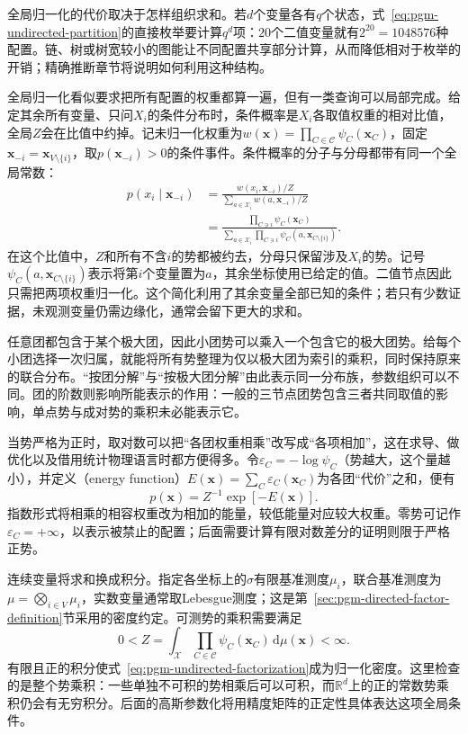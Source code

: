 全局归一化的代价取决于怎样组织求和。若$d$个变量各有$q$个状态，式~\eqref{eq:pgm-undirected-partition}的直接枚举要计算$q^d$项：$20$个二值变量就有$2^{20}=1048576$种配置。链、树或树宽较小的图能让不同配置共享部分计算，从而降低相对于枚举的开销；精确推断章节将说明如何利用这种结构。

全局归一化看似要求把所有配置的权重都算一遍，但有一类查询可以局部完成。给定其余所有变量、只问$X_i$的条件分布时，条件概率是$X_i$各取值权重的相对比值，全局$Z$会在比值中约掉。记未归一化权重为$w(\bm{x})=\prod_{C\in\mathcal C}\psi_C(\bm{x}_C)$，固定$\bm{x}_{-i}=\bm{x}_{V\setminus\{i\}}$，取$p(\bm{x}_{-i})>0$的条件事件。条件概率的分子与分母都带有同一个全局常数：
\begin{equation}
  \begin{aligned}
    p(x_i\mid\bm{x}_{-i})
      &=\frac{w(x_i,\bm{x}_{-i})/Z}
        {\sum_{a\in\mathcal X_i}w(a,\bm{x}_{-i})/Z}\\
      &=\frac{\prod_{C\ni i}\psi_C(\bm{x}_C)}
        {\sum_{a\in\mathcal X_i}
          \prod_{C\ni i}\psi_C(a,\bm{x}_{C\setminus\{i\}})}.
  \end{aligned}
  \label{eq:pgm-undirected-local-conditional}
\end{equation}
在这个比值中，$Z$和所有不含$i$的势都被约去，分母只保留涉及$X_i$的势。记号$\psi_C(a,\bm{x}_{C\setminus\{i\}})$表示将第$i$个变量置为$a$，其余坐标使用已给定的值。二值节点因此只需把两项权重归一化。这个简化利用了其余变量全部已知的条件；若只有少数证据，未观测变量仍需边缘化，通常会留下更大的求和。

任意团都包含于某个极大团，因此小团势可以乘入一个包含它的极大团势。给每个小团选择一次归属，就能将所有势整理为仅以极大团为索引的乘积，同时保持原来的联合分布。“按团分解”与“按极大团分解”由此表示同一分布族，参数组织可以不同。团的阶数则影响所能表示的作用：一般的三节点团势包含三者共同取值的影响，单点势与成对势的乘积未必能表示它。

当势严格为正时，取对数可以把“各团权重相乘”改写成“各项相加”，这在求导、做优化以及借用统计物理语言时都方便得多。令$\varepsilon_C=-\log\psi_C$（势越大，这个量越小），并定义（energy function）$E(\bm{x})=\sum_C\varepsilon_C(\bm{x}_C)$为各团“代价”之和，便有
\[
  p(\bm{x})=Z^{-1}\exp[-E(\bm{x})].
\]
指数形式将相乘的相容权重改为相加的能量，较低能量对应较大权重。零势可记作$\varepsilon_C=+\infty$，以表示被禁止的配置；后面需要计算有限对数差分的证明则限于严格正势。

连续变量将求和换成积分。指定各坐标上的$\sigma$有限基准测度$\mu_i$，联合基准测度为$\mu=\bigotimes_{i\in V}\mu_i$，实数变量通常取Lebesgue测度；这是第~\ref{sec:pgm-directed-factor-definition}节采用的密度约定。可测势的乘积需要满足
\begin{equation}
  0<Z=\int_{\mathcal{X}}\prod_{C\in\mathcal{C}}
       \psi_C(\bm{x}_C)\,\mathrm{d}\mu(\bm{x})<\infty.
  \label{eq:pgm-undirected-continuous-partition}
\end{equation}
有限且正的积分使式~\eqref{eq:pgm-undirected-factorization}成为归一化密度。这里检查的是整个势乘积：一些单独不可积的势相乘后可以可积，而$\mathbb{R}^d$上的正的常数势乘积仍会有无穷积分。后面的高斯参数化将用精度矩阵的正定性具体表达这项全局条件。


